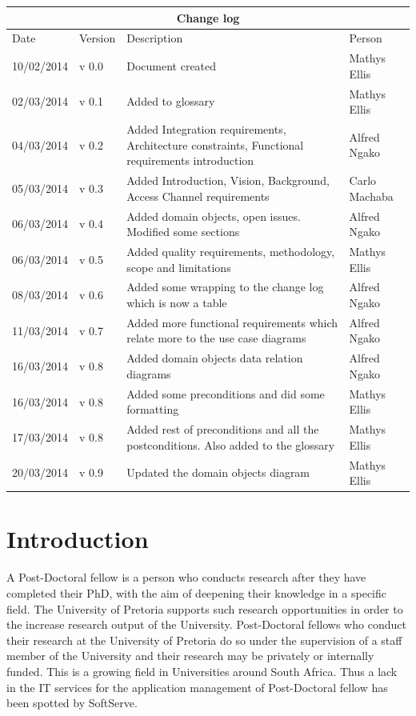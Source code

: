 \documentclass[12pt]{article}
\begin{document}
\begin{center}
\begin{tabular}{|l|p{1.4cm}|p{8cm}|p{2.8cm}|}
\hline
\multicolumn{4}{|c|}{\bf Change log} \\
\hline
 Date & Version & Description &  Person \\
\hline
10/02/2014 & v 0.0 & Document created & Mathys Ellis \\
\hline
02/03/2014 & v 0.1 & Added to glossary & Mathys Ellis \\
\hline
04/03/2014 & v 0.2 & Added Integration requirements, Architecture constraints, Functional requirements introduction & Alfred Ngako \\
\hline
05/03/2014 & v 0.3 & Added Introduction, Vision, Background, Access Channel requirements & Carlo Machaba \\
\hline
06/03/2014 & v 0.4 & Added domain objects, open issues. Modified some sections & Alfred Ngako \\
\hline
06/03/2014 & v 0.5 & Added quality requirements, methodology, scope and limitations & Mathys Ellis \\
\hline
08/03/2014 & v 0.6 & Added some wrapping to the change log which is now a table & Alfred Ngako \\
\hline
11/03/2014 & v 0.7 & Added more functional requirements which relate more to the use case diagrams & Alfred Ngako \\
\hline
16/03/2014 & v 0.8 & Added domain objects data relation diagrams & Alfred Ngako \\
\hline
16/03/2014 & v 0.8 & Added some preconditions and did some formatting & Mathys Ellis \\
\hline
17/03/2014 & v 0.8 & Added rest of preconditions and all the postconditions. Also added to the glossary & Mathys Ellis \\
\hline
20/03/2014 & v 0.9 & Updated the domain objects diagram  & Mathys Ellis \\
\hline
\end{tabular}
\end{center}
\newpage
\tableofcontents

\listoffigures
\newpage
\section{Introduction} %
A Post-Doctoral fellow is a person who conducts research after they have completed their PhD, with the aim of deepening their knowledge in a specific field. The University of Pretoria supports such research opportunities in order to the increase research output of the University. Post-Doctoral fellows who conduct their research at the University of Pretoria do so under the supervision of a staff member of the University and their research may be privately or internally funded. This is a growing field in Universities around South Africa. Thus a lack in the IT services for the application management of Post-Doctoral fellow has been spotted by SoftServe.
\vspace{0.2in}
\end{document}

